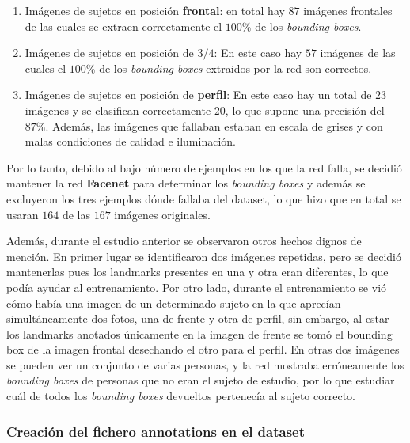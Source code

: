            \begin{enumerate}
                \item Imágenes de sujetos en posición \textbf{ frontal}: en total hay $87$ imágenes frontales de las cuales se extraen correctamente el \textbf{$100\%$} de los \textit{bounding boxes}.
                \item Imágenes de sujetos en posición de \textbf{$3/4$}: En este caso hay $57$ imágenes de las cuales el \textbf{$100\%$} de los \textit{bounding boxes} extraidos por la red son correctos.
                \item Imágenes de sujetos en posición de \textbf{perfil}: En este caso hay un total de $23$ imágenes y se clasifican correctamente $20$, lo que supone una precisión del \textbf{$87\%$}. Además, las imágenes que fallaban estaban en escala de grises y con malas condiciones de calidad e iluminación.
            \end{enumerate}

            \noindent Por lo tanto, debido al bajo número de ejemplos en los que la red falla, se decidió mantener la red \textbf{Facenet} para determinar los \textit{bounding boxes} y además se excluyeron los tres ejemplos dónde fallaba del dataset, lo que hizo que en total se usaran $164$ de las $167$ imágenes originales.

            \medskip 

            \noindent Además, durante el estudio anterior se observaron otros hechos dignos de mención. En primer lugar se identificaron dos imágenes repetidas, pero se decidió mantenerlas pues los landmarks presentes en una y otra eran diferentes, lo que podía ayudar al entrenamiento. Por otro lado, durante el entrenamiento se vió cómo había una imagen de un determinado sujeto en la que aprecían simultáneamente dos fotos, una  de frente y otra de perfil, sin embargo, al estar los landmarks anotados únicamente en la imagen de frente se tomó el bounding box de la imagen frontal desechando el otro para el perfil. En otras dos imágenes se pueden ver un conjunto de varias personas, y la red mostraba erróneamente los \textit{bounding boxes} de personas que no eran el sujeto de estudio, por lo que estudiar cuál de todos los \textit{bounding boxes} devueltos pertenecía al sujeto correcto.

        \subsubsection{Creación del fichero annotations en el dataset}


